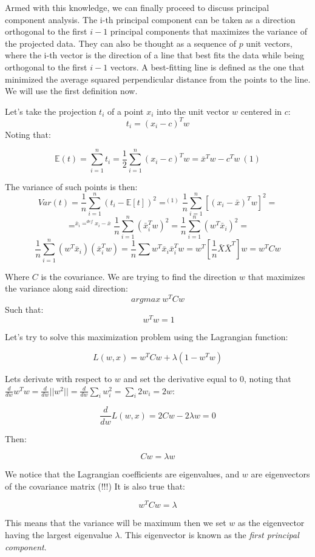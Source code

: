 \documentclass{article}
\begin{document}
Armed with this knowledge, we can finally proceed to discuss principal
component analysis. The i-th principal component can be taken as a
direction orthogonal to the first \(i-1\) principal components that
maximizes the variance of the projected data. They can also be thought
as a sequence of \(p\) unit vectors, where the i-th vector is the
direction of a line that best fits the data while being orthogonal to
the first \(i-1\) vectors. A best-fitting line is defined as the one
that minimized the average squared perpendicular distance from the
points to the line. We will use the first definition now.

Let's take the projection \(t_i\) of a point \(x_i\) into the unit
vector \(w\) centered in \(c\): \[t_i = (x_i-c)^Tw \] Noting that:

\[\mathbb{E}(t)= \sum_{i=1}^nt_i = \frac{1}{2}\sum_{i=1}^n (x_i -c)^Tw = \bar{x}^Tw - c^Tw\ (1)\]

The variance of such points is then:
\[Var(t)=\frac{1}{n}\sum_{i=1}^n (t_i - \mathbb{E}[t])^2 =^{(1)} \frac{1}{n}\sum_{i=1}^n [(x_i - \bar x )^T w]^2 = \]
\[ =^{\bar x_i =^{def}x_i - \bar x} \frac{1}{n}\sum_{i=1}^n (\bar x_i^T w)^2 =  \frac{1}{n} \sum_{i=1}^n (w^T\bar{x}_i)^2 = \]
\[ \frac{1}{n} \sum_{i=1}^n (w^T\bar{x}_i)(\bar{x}_i^Tw) = \frac{1}{n} \sum{w^T}{\bar{x}_i\bar{x}_i^T w} = w^T[\frac{1}{n}\bar X \bar X^T]w = w^TCw\]

Where \(C\) is the covariance. We are trying to find the direction \(w\)
that maximizes the variance along said direction: \[argmax\ w^T C w\]
Such that: \[\ w^Tw=1\]

Let's try to solve this maximization problem using the Lagrangian
function:

\[L(w, x)=w^TCw+\lambda (1-w^Tw)\]

Lets derivate with respect to \(w\) and set the derivative equal to
\(0\), noting that
\(\frac{d}{dw}w^Tw=\frac{d}{dw}||w^2||=\frac{d}{dw}\sum_{i}w_i^2=\sum_{i}2w_i=2w\):

\[\frac{d}{dw}L(w, x)=2Cw-2\lambda w=0\]

Then:

\[Cw=\lambda w\]

We notice that the Lagrangian coefficients are eigenvalues, and \(w\)
are eigenvectors of the covariance matrix (!!!) It is also true that:

\[w^TCw=\lambda\]

This means that the variance will be maximum then we set \(w\) as the
eigenvector having the largest eigenvalue \(\lambda\). This eigenvector
is known as the \emph{first principal component}.
\end{document}
